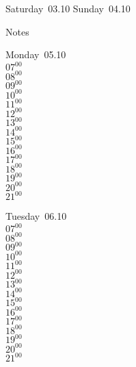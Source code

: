 \documentclass[11pt,a4paper]{book}\usepackage[]{graphicx}\usepackage[]{color}
\begin{document}
\begin{weekendbox}
  Saturday~03.10
  \tcblower
  Sunday~04.10
\end{weekendbox} %
\begin{notebox}
  Notes
\end{notebox}
\clearpage
\begin{headerbox}
\end{headerbox}
\begin{weekdaybox}
  Monday~05.10\\
  { 
  \vfill
  $07^{00}$\\
$08^{00}$\\
$09^{00}$\\
$10^{00}$\\
$11^{00}$\\
$12^{00}$\\
$13^{00}$\\
$14^{00}$\\
$15^{00}$\\
$16^{00}$\\
$17^{00}$\\
$18^{00}$\\
$19^{00}$\\
$20^{00}$\\
$21^{00}$\\
  }
\end{weekdaybox}
\begin{weekdaybox}
  Tuesday~06.10\\
  { 
  \vfill
  $07^{00}$\\
$08^{00}$\\
$09^{00}$\\
$10^{00}$\\
$11^{00}$\\
$12^{00}$\\
$13^{00}$\\
$14^{00}$\\
$15^{00}$\\
$16^{00}$\\
$17^{00}$\\
$18^{00}$\\
$19^{00}$\\
$20^{00}$\\
$21^{00}$\\
  }
\end{weekdaybox}
\end{document}
